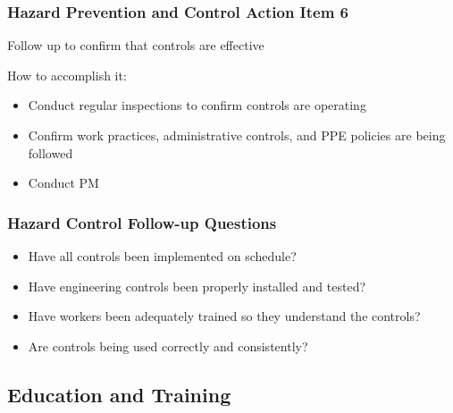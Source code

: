 \begin{frame}
	\frametitle{Hazard Prevention and Control Action Item 6}

    Follow up to confirm that controls are effective

    \begin{block}{How to accomplish it:}
        \begin{itemize}[<+- | alert@+>]
            \item Conduct regular inspections to confirm controls are operating
            \item Confirm work practices, administrative controls, and PPE policies are being followed
            \item Conduct PM
        \end{itemize}
    \end{block}
\end{frame}

\begin{frame}
    \frametitle{Hazard Control Follow-up Questions}

    \begin{itemize}[<+- | alert@+>]
        \item Have all controls been implemented on schedule?
        \item Have engineering controls been properly installed and tested?
        \item Have workers been adequately trained so they understand the controls?
        \item Are controls being used correctly and consistently?
    \end{itemize}
\end{frame}

\subsection{Education and Training}

